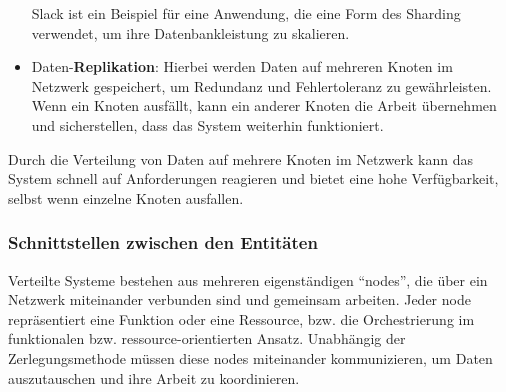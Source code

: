 \documentclass[../vs-script-first-v01.tex]{subfiles}
\begin{document}
\begin{itemize}
Slack ist ein Beispiel für eine Anwendung, die eine Form des Sharding verwendet, um ihre Datenbankleistung zu skalieren. 
\item Daten-\textbf{Replikation}: Hierbei werden Daten auf mehreren Knoten im Netzwerk gespeichert, um Redundanz und Fehlertoleranz zu gewährleisten. Wenn ein Knoten ausfällt, kann ein anderer Knoten die Arbeit übernehmen und sicherstellen, dass das System weiterhin funktioniert.
\end{itemize}
 Durch die Verteilung von Daten auf mehrere Knoten im Netzwerk kann das System schnell auf Anforderungen reagieren und bietet eine hohe Verfügbarkeit, selbst wenn einzelne Knoten ausfallen.
\newpage
\subsubsection{Schnittstellen zwischen den Entitäten}

Verteilte Systeme bestehen aus mehreren eigenständigen \enquote{nodes}, die über ein Netzwerk miteinander verbunden sind und gemeinsam arbeiten. Jeder node repräsentiert eine Funktion oder eine Ressource, bzw. die Orchestrierung im funktionalen bzw. ressource-orientierten Ansatz. Unabhängig der Zerlegungsmethode müssen diese nodes miteinander kommunizieren, um Daten auszutauschen und ihre Arbeit zu koordinieren. 
\end{document}
